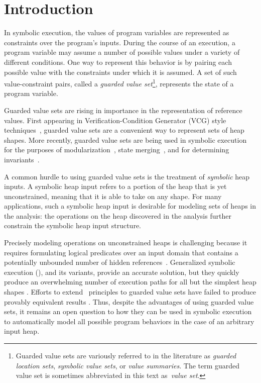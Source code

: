 \section{Introduction}

In symbolic execution, the values of program variables are represented
as constraints over the program's inputs. During the course of an
execution, a program variable may assume a number of possible values
under a variety of different conditions. One way to represent this
behavior is by pairing each possible value with the constraints under
which it is assumed. A set of such value-constraint pairs, called a
\emph{guarded value set}\footnote{Guarded value sets are variously
  referred to in the literature as \emph{guarded location sets},
  \emph{symbolic value sets}, or \emph{value summaries}. The term
  guarded value set is sometimes abbreviated in this text
  as~\emph{value set}.}, represents the state of a program variable.

Guarded value sets are rising in importance in the representation of
reference values. First appearing in Verification-Condition Generator
(VCG) style techniques~\cite{Xie:2005,Dillig:2011}, guarded value sets
are a convenient way to represent sets of heap shapes. More recently,
guarded value sets are being used in symbolic execution for the
purposes of modularization~\cite{Yorsh:2008}, state
merging~\cite{Sen:2014}, and for determining
invariants~\cite{Ferrara:2014,Torlak:2014}.

A common hurdle to using guarded value sets is the treatment of
\emph{symbolic} heap inputs. A symbolic heap input refers to a portion of the heap that is yet unconstrained, meaning that it is able to take on any shape. For many applications, such a symbolic heap input is desirable for modeling sets of heaps in the analysis: the operations on the heap discovered in the analysis further constrain the symbolic heap input
structure.

Precisely modeling operations on unconstrained heaps
is challenging because it requires formulating logical predicates over
an input domain that contains a potentially unbounded number of hidden
references~\cite{Chen:2013,Qu:2011}. Generalized symbolic execution
(\gsetxt{}), and its variants, provide an accurate
solution, but they quickly produce an overwhelming number of execution
paths for all but the simplest heap shapes \cite{GSE03,Deng:2007}. Efforts to
extend~\gsetxt{} principles to guarded value sets have failed to
produce provably equivalent results \cite{LISTEFFORTS}. Thus, despite
the advantages of using guarded value sets, it remains an open
question to how they can be used in symbolic execution to automatically
model all possible program behaviors in the case of an arbitrary input
heap.


